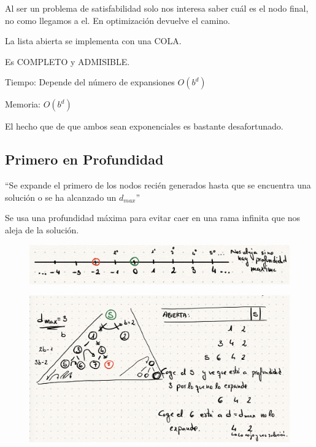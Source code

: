 \documentclass[12pt, twoside, openright]{report} %
\begin{document}
	Al ser un problema de satisfabilidad solo nos interesa saber cuál es
    el nodo final, no como llegamos a el. En optimización devuelve el
    camino.

	La lista abierta se implementa con una COLA.

	Es COMPLETO y ADMISIBLE.

	Tiempo: Depende del número de expansiones \(O(b^d)\)

	Memoria: \(O(b^d)\)

	El hecho que de que ambos sean exponenciales es bastante
    desafortunado.

\subsection{Primero en Profundidad}

  ``Se expande el primero de los nodos recién generados hasta que se
  encuentra una solución o se ha alcanzado un \(d_{max}\)''

  
    Se usa una profundidad máxima para evitar caer en una rama infinita
    que nos aleja de la solución.
	\begin{figure}[H]
		{\includegraphics[scale=.25]{Untitled 47.png}}
	\end{figure}
	\begin{figure}[H]
		{\includegraphics[scale=.2]{Untitled 48.png}}
	\end{figure}
 
	
\end{document}

